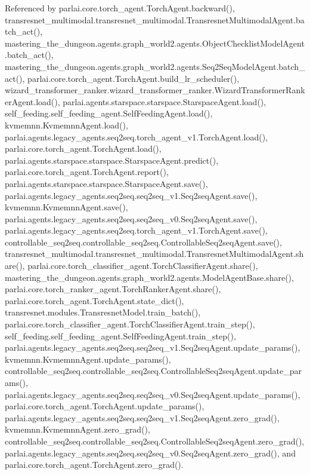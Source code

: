 Referenced by parlai.\+core.\+torch\+\_\+agent.\+Torch\+Agent.\+backward(), transresnet\+\_\+multimodal.\+transresnet\+\_\+multimodal.\+Transresnet\+Multimodal\+Agent.\+batch\+\_\+act(), mastering\+\_\+the\+\_\+dungeon.\+agents.\+graph\+\_\+world2.\+agents.\+Object\+Checklist\+Model\+Agent.\+batch\+\_\+act(), mastering\+\_\+the\+\_\+dungeon.\+agents.\+graph\+\_\+world2.\+agents.\+Seq2\+Seq\+Model\+Agent.\+batch\+\_\+act(), parlai.\+core.\+torch\+\_\+agent.\+Torch\+Agent.\+build\+\_\+lr\+\_\+scheduler(), wizard\+\_\+transformer\+\_\+ranker.\+wizard\+\_\+transformer\+\_\+ranker.\+Wizard\+Transformer\+Ranker\+Agent.\+load(), parlai.\+agents.\+starspace.\+starspace.\+Starspace\+Agent.\+load(), self\+\_\+feeding.\+self\+\_\+feeding\+\_\+agent.\+Self\+Feeding\+Agent.\+load(), kvmemnn.\+Kvmemnn\+Agent.\+load(), parlai.\+agents.\+legacy\+\_\+agents.\+seq2seq.\+torch\+\_\+agent\+\_\+v1.\+Torch\+Agent.\+load(), parlai.\+core.\+torch\+\_\+agent.\+Torch\+Agent.\+load(), parlai.\+agents.\+starspace.\+starspace.\+Starspace\+Agent.\+predict(), parlai.\+core.\+torch\+\_\+agent.\+Torch\+Agent.\+report(), parlai.\+agents.\+starspace.\+starspace.\+Starspace\+Agent.\+save(), parlai.\+agents.\+legacy\+\_\+agents.\+seq2seq.\+seq2seq\+\_\+v1.\+Seq2seq\+Agent.\+save(), kvmemnn.\+Kvmemnn\+Agent.\+save(), parlai.\+agents.\+legacy\+\_\+agents.\+seq2seq.\+seq2seq\+\_\+v0.\+Seq2seq\+Agent.\+save(), parlai.\+agents.\+legacy\+\_\+agents.\+seq2seq.\+torch\+\_\+agent\+\_\+v1.\+Torch\+Agent.\+save(), controllable\+\_\+seq2seq.\+controllable\+\_\+seq2seq.\+Controllable\+Seq2seq\+Agent.\+save(), transresnet\+\_\+multimodal.\+transresnet\+\_\+multimodal.\+Transresnet\+Multimodal\+Agent.\+share(), parlai.\+core.\+torch\+\_\+classifier\+\_\+agent.\+Torch\+Classifier\+Agent.\+share(), mastering\+\_\+the\+\_\+dungeon.\+agents.\+graph\+\_\+world2.\+agents.\+Model\+Agent\+Base.\+share(), parlai.\+core.\+torch\+\_\+ranker\+\_\+agent.\+Torch\+Ranker\+Agent.\+share(), parlai.\+core.\+torch\+\_\+agent.\+Torch\+Agent.\+state\+\_\+dict(), transresnet.\+modules.\+Transresnet\+Model.\+train\+\_\+batch(), parlai.\+core.\+torch\+\_\+classifier\+\_\+agent.\+Torch\+Classifier\+Agent.\+train\+\_\+step(), self\+\_\+feeding.\+self\+\_\+feeding\+\_\+agent.\+Self\+Feeding\+Agent.\+train\+\_\+step(), parlai.\+agents.\+legacy\+\_\+agents.\+seq2seq.\+seq2seq\+\_\+v1.\+Seq2seq\+Agent.\+update\+\_\+params(), kvmemnn.\+Kvmemnn\+Agent.\+update\+\_\+params(), controllable\+\_\+seq2seq.\+controllable\+\_\+seq2seq.\+Controllable\+Seq2seq\+Agent.\+update\+\_\+params(), parlai.\+agents.\+legacy\+\_\+agents.\+seq2seq.\+seq2seq\+\_\+v0.\+Seq2seq\+Agent.\+update\+\_\+params(), parlai.\+core.\+torch\+\_\+agent.\+Torch\+Agent.\+update\+\_\+params(), parlai.\+agents.\+legacy\+\_\+agents.\+seq2seq.\+seq2seq\+\_\+v1.\+Seq2seq\+Agent.\+zero\+\_\+grad(), kvmemnn.\+Kvmemnn\+Agent.\+zero\+\_\+grad(), controllable\+\_\+seq2seq.\+controllable\+\_\+seq2seq.\+Controllable\+Seq2seq\+Agent.\+zero\+\_\+grad(), parlai.\+agents.\+legacy\+\_\+agents.\+seq2seq.\+seq2seq\+\_\+v0.\+Seq2seq\+Agent.\+zero\+\_\+grad(), and parlai.\+core.\+torch\+\_\+agent.\+Torch\+Agent.\+zero\+\_\+grad().

